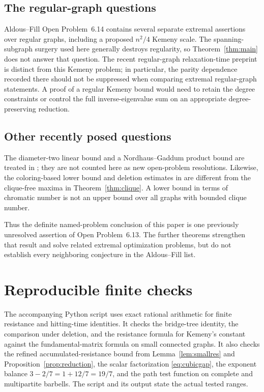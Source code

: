 \documentclass[11pt]{amsart}
\numberwithin{equation}{section}
\theoremstyle{definition}
\theoremstyle{remark}
\begin{document}
\subsection{The regular-graph questions}
Aldous--Fill Open Problem~6.14 contains several separate extremal assertions over regular graphs, including a proposed $n^2/4$ Kemeny scale. The spanning-subgraph surgery used here generally destroys regularity, so Theorem~\ref{thm:main} does not answer that question. The recent regular-graph relaxation-time preprint \cite{Zhu} is distinct from this Kemeny problem; in particular, the parity dependence recorded there should not be suppressed when comparing extremal regular-graph statements. A proof of a regular Kemeny bound would need to retain the degree constraints or control the full inverse-eigenvalue sum on an appropriate degree-preserving reduction.

\subsection{Other recently posed questions}
The diameter-two linear bound and a Nordhaus--Gaddum product bound are treated in \cite{LiSunYang}; they are not counted here as new open-problem resolutions. Likewise, the coloring-based lower bound and deletion estimates in \cite{Abiad} are different from the clique-free maxima in Theorem~\ref{thm:clique}. A lower bound in terms of chromatic number is not an upper bound over all graphs with bounded clique number.

Thus the definite named-problem conclusion of this paper is one previously unresolved assertion of Open Problem~6.13. The further theorems strengthen that result and solve related extremal optimization problems, but do not establish every neighboring conjecture in the Aldous--Fill list.

\appendix
\section{Reproducible finite checks}\label{app:checks}
The accompanying Python script uses exact rational arithmetic for finite resistance and hitting-time identities. It checks the bridge-tree identity, the comparison under deletion, and the resistance formula for Kemeny's constant against the fundamental-matrix formula on small connected graphs. It also checks the refined accumulated-resistance bound from Lemma~\ref{lem:smallres} and Proposition~\ref{prop:reduction}, the scalar factorization \eqref{eq:cubicgap}, the exponent balance $3-2/7=1+12/7=19/7$, and the path test function on complete and multipartite barbells. The script and its output state the actual tested ranges.
\end{document}
